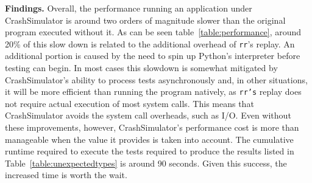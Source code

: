{\bf Findings.}
Overall, the performance running an application
under CrashSimulator is around
two orders of magnitude slower
than the original program executed without it.
As can be seen table~\ref{table:performance}, around 20\%
of this slow down is related to the additional overhead of {\tt rr}'s replay.
An additional portion is caused by the need to spin up Python's interpreter
before testing can begin.
In most cases
this slowdown is somewhat mitigated by CrashSimulator's ability to process
tests asynchronously and, in other situations, it will be more efficient than
running the program natively, as {\tt rr's} replay does not require
actual execution of most system calls.  This means that CrashSimulator
avoids the system call overheads, such as I/O.
Even without these improvements, however, CrashSimulator's performance
cost is more
than manageable when the value it provides is taken into account.  The
cumulative runtime required to execute the tests required to produce the
results listed in Table~\ref{table:unexpectedtypes} is around 90 seconds.
Given this success, the increased time is worth the wait.
